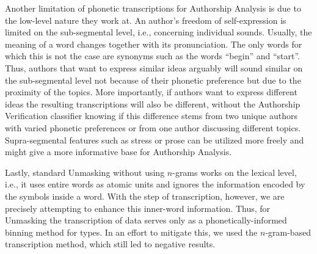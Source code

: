 Another limitation of phonetic transcriptions for Authorship Analysis is due to the low-level nature they work at.
An author's freedom of self-expression is limited on the sub-segmental level, i.e., concerning individual sounds.
Usually, the meaning of a word changes together with its pronunciation.
The only words for which this is not the case are synonyms such as the words ``begin'' and ``start''.
Thus, authors that want to express similar ideas arguably will sound similar on the sub-segmental level not because of their phonetic preference but due to the proximity of the topics.
More importantly, if authors want to express different ideas the resulting transcriptions will also be different, without the Authorship Verification classifier knowing if this difference stems from two unique authors with varied phonetic preferences or from one author discussing different topics.
Supra-segmental features such as stress or prose can be utilized more freely and might give a more informative base for Authorship Analysis.

Lastly, standard Unmasking without using $n$-grams works on the lexical level, i.e., it uses entire words as atomic units and ignores the information encoded by the symbols inside a word.
With the step of transcription, however, we are precisely attempting to enhance this inner-word information.
Thus, for Unmasking the transcription of data serves only as a phonetically-informed binning method for types.
In an effort to mitigate this, we used the $n$-gram-based transcription method, which still led to negative results.